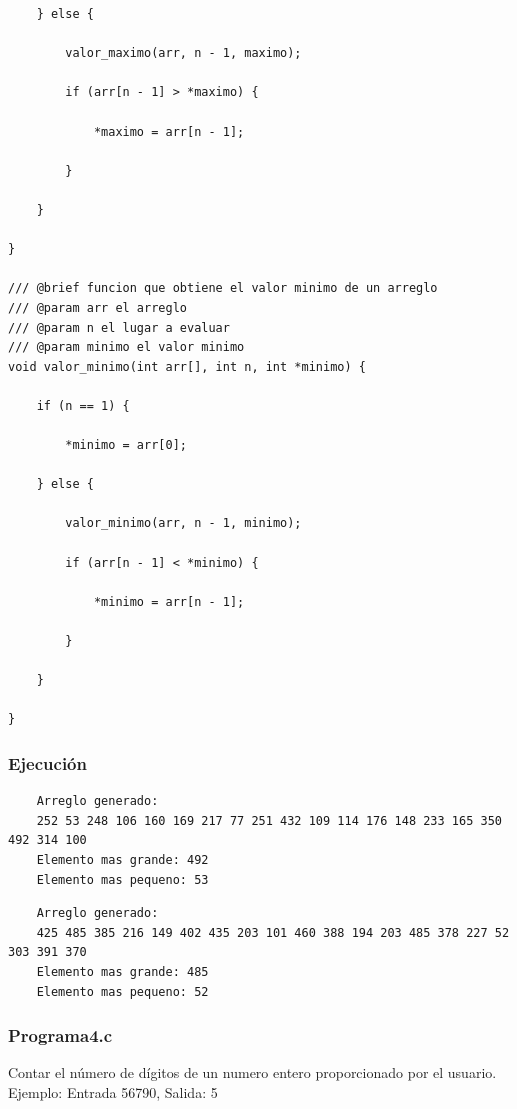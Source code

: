 \documentclass{article}
\begin{document}
\begin{lstlisting}
	} else {
		
		valor_maximo(arr, n - 1, maximo);
		
		if (arr[n - 1] > *maximo) {
			
			*maximo = arr[n - 1];
			
		}
		
	}
	
}

/// @brief funcion que obtiene el valor minimo de un arreglo
/// @param arr el arreglo
/// @param n el lugar a evaluar
/// @param minimo el valor minimo
void valor_minimo(int arr[], int n, int *minimo) {
	
	if (n == 1) {
		
		*minimo = arr[0];
		
	} else {
		
		valor_minimo(arr, n - 1, minimo);
		
		if (arr[n - 1] < *minimo) {
			
			*minimo = arr[n - 1];
			
		}
		
	}
	
}
	\end{lstlisting}
	
	\newpage
	
	\subsubsection{Ejecución}
	
	\begin{lstlisting}
	Arreglo generado:
	252 53 248 106 160 169 217 77 251 432 109 114 176 148 233 165 350 492 314 100 
	Elemento mas grande: 492
	Elemento mas pequeno: 53
	\end{lstlisting}
	
	\begin{lstlisting}
	Arreglo generado:
	425 485 385 216 149 402 435 203 101 460 388 194 203 485 378 227 52 303 391 370
	Elemento mas grande: 485
	Elemento mas pequeno: 52
	\end{lstlisting}
	
	\newpage
	
	\subsubsection{Programa4.c}
	
	Contar el número de dígitos de un numero entero proporcionado por el usuario.
	Ejemplo: Entrada 56790, Salida: 5
		
\end{document}
